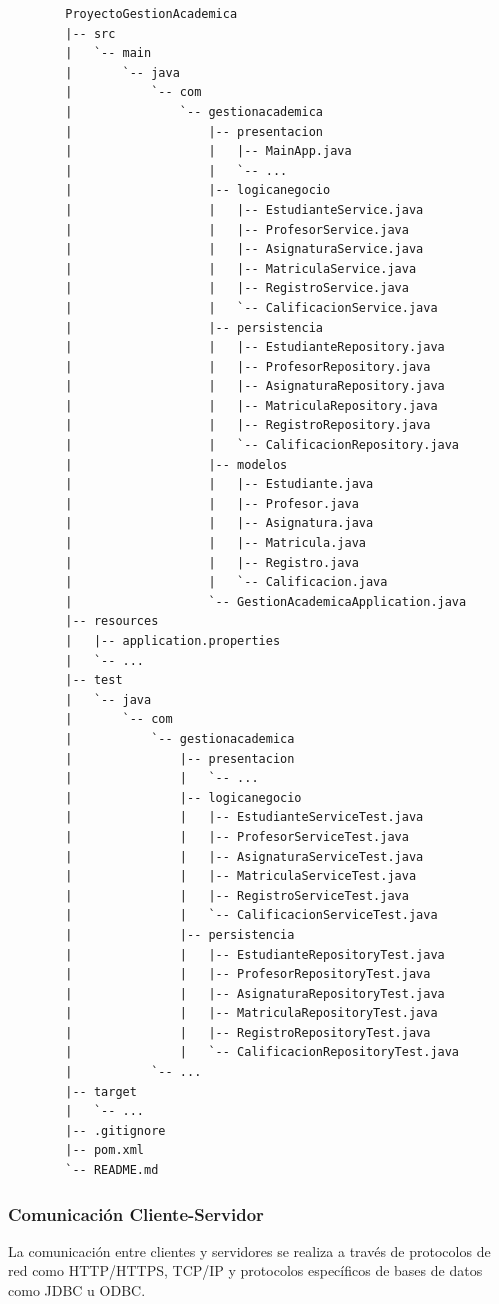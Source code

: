	\begin{verbatim}
		ProyectoGestionAcademica
		|-- src
		|   `-- main
		|       `-- java
		|           `-- com
		|               `-- gestionacademica
		|                   |-- presentacion
		|                   |   |-- MainApp.java
		|                   |   `-- ...
		|                   |-- logicanegocio
		|                   |   |-- EstudianteService.java
		|                   |   |-- ProfesorService.java
		|                   |   |-- AsignaturaService.java
		|                   |   |-- MatriculaService.java
		|                   |   |-- RegistroService.java
		|                   |   `-- CalificacionService.java
		|                   |-- persistencia
		|                   |   |-- EstudianteRepository.java
		|                   |   |-- ProfesorRepository.java
		|                   |   |-- AsignaturaRepository.java
		|                   |   |-- MatriculaRepository.java
		|                   |   |-- RegistroRepository.java
		|                   |   `-- CalificacionRepository.java
		|                   |-- modelos
		|                   |   |-- Estudiante.java
		|                   |   |-- Profesor.java
		|                   |   |-- Asignatura.java
		|                   |   |-- Matricula.java
		|                   |   |-- Registro.java
		|                   |   `-- Calificacion.java
		|                   `-- GestionAcademicaApplication.java
		|-- resources
		|   |-- application.properties
		|   `-- ...
		|-- test
		|   `-- java
		|       `-- com
		|           `-- gestionacademica
		|               |-- presentacion
		|               |   `-- ...
		|               |-- logicanegocio
		|               |   |-- EstudianteServiceTest.java
		|               |   |-- ProfesorServiceTest.java
		|               |   |-- AsignaturaServiceTest.java
		|               |   |-- MatriculaServiceTest.java
		|               |   |-- RegistroServiceTest.java
		|               |   `-- CalificacionServiceTest.java
		|               |-- persistencia
		|               |   |-- EstudianteRepositoryTest.java
		|               |   |-- ProfesorRepositoryTest.java
		|               |   |-- AsignaturaRepositoryTest.java
		|               |   |-- MatriculaRepositoryTest.java
		|               |   |-- RegistroRepositoryTest.java
		|               |   `-- CalificacionRepositoryTest.java
		|           `-- ...
		|-- target
		|   `-- ...
		|-- .gitignore
		|-- pom.xml
		`-- README.md
	\end{verbatim}
	
	\subsubsection{Comunicación Cliente-Servidor}
	La comunicación entre clientes y servidores se realiza a través de protocolos de red como HTTP/HTTPS, TCP/IP y protocolos específicos de bases de datos como JDBC u ODBC.
	
